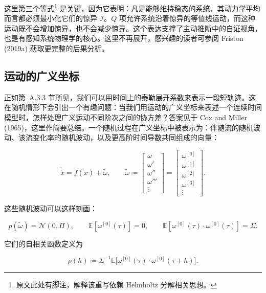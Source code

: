 这里第三个等式\footnote{原文此处有脚注，解释该重写依赖 Helmholtz 分解相关思想。} 是关键，因为它表明：凡是能够维持稳态的系统，其动力学平均而言都必须最小化它们的惊异 $\mathcal{I}$。$Q$ 项允许系统沿着惊异的等值线运动，而这种运动既不会增加惊异，也不会减少惊异。这个表达支撑了主动推断中的自证视角，也是有感知系统物理学的核心。这里不再展开，感兴趣的读者可参阅 Friston (2019a) 获取更完整的后果分析。

\subsection{运动的广义坐标}

正如第~A.3.3 节所见，我们可以用时间上的泰勒展开系数来表示一段短轨迹。这在随机情形下会引出一个有趣问题：当我们用运动的广义坐标来表述一个连续时间模型时，怎样处理广义运动不同阶次之间的协方差？答案见于 Cox and Miller (1965)，这里作简要总结。一个随机过程在广义坐标中被表示为：伴随流的随机波动、该流变化率的随机波动，以及更高阶时间导数共同组成的向量：

\begin{equation}
\dot{\tilde x} = \tilde f(\tilde x) + \tilde \omega,
\qquad
\tilde \omega \coloneqq
\begin{bmatrix}
\omega \\
\omega' \\
\omega'' \\
\omega''' \\
\vdots
\end{bmatrix}
=
\begin{bmatrix}
\omega^{[0]} \\
\omega^{[1]} \\
\omega^{[2]} \\
\omega^{[3]} \\
\vdots
\end{bmatrix}.
\tag{A.51}
\end{equation}

这些随机波动可以这样刻画：

\begin{equation}
p(\tilde \omega) = \mathcal{N}(0,\Pi),
\qquad
\mathbb{E}[\omega^{[0]}(\tau)] = 0,
\qquad
\mathbb{E}[\omega^{[0]}(\tau)\cdot \omega^{[0]}(\tau)] = \Sigma.
\tag{A.52}
\end{equation}

它们的自相关函数定义为

\begin{equation}
\rho(h)
\coloneqq
\Sigma^{-1}\mathbb{E}\bigl[\omega^{[0]}(\tau)\cdot \omega^{[0]}(\tau+h)\bigr].
\tag{A.53}
\end{equation}

